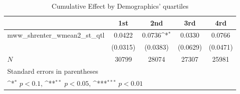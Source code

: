 \begin{table}[htbp]\centering
\def\sym#1{\ifmmode^{#1}\else\(^{#1}\)\fi}
\caption{Cumulative Effect by Demographics' quartiles}
\begin{tabular}{l*{4}{c}}
\hline\hline
            &\multicolumn{1}{c}{1st}&\multicolumn{1}{c}{2nd}&\multicolumn{1}{c}{3rd}&\multicolumn{1}{c}{4rd}\\
\hline
mww\_shrenter\_wmean2\_st\_qtl&      0.0422         &      0.0736\sym{*}  &      0.0330         &      0.0766         \\
            &    (0.0315)         &    (0.0383)         &    (0.0629)         &    (0.0471)         \\
\hline
\(N\)       &       30799         &       28074         &       27307         &       25981         \\
\hline\hline
\multicolumn{5}{l}{\footnotesize Standard errors in parentheses}\\
\multicolumn{5}{l}{\footnotesize \sym{*} \(p<0.1\), \sym{**} \(p<0.05\), \sym{***} \(p<0.01\)}\\
\end{tabular}
\end{table}
